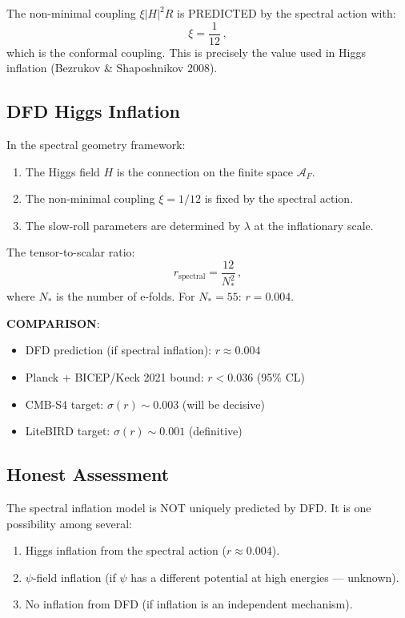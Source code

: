 \documentclass[11pt,a4paper]{article}
\begin{document}
The non-minimal coupling $\xi |H|^2 R$ is PREDICTED by the spectral action with:
\begin{equation}
\xi = \frac{1}{12}\,,
\end{equation}
which is the conformal coupling. This is precisely the value used in Higgs inflation (Bezrukov \& Shaposhnikov 2008).

\subsection{DFD Higgs Inflation}

In the spectral geometry framework:
\begin{enumerate}
\item The Higgs field $H$ is the connection on the finite space $\mathcal{A}_F$.
\item The non-minimal coupling $\xi = 1/12$ is fixed by the spectral action.
\item The slow-roll parameters are determined by $\lambda$ at the inflationary scale.
\end{enumerate}

The tensor-to-scalar ratio:
\begin{equation}
r_{\mathrm{spectral}} = \frac{12}{N_*^2}\,,
\end{equation}
where $N_*$ is the number of e-folds. For $N_* = 55$: $r = 0.004$.

\textbf{COMPARISON}:
\begin{itemize}
\item DFD prediction (if spectral inflation): $r \approx 0.004$
\item Planck + BICEP/Keck 2021 bound: $r < 0.036$ (95\% CL)
\item CMB-S4 target: $\sigma(r) \sim 0.003$ (will be decisive)
\item LiteBIRD target: $\sigma(r) \sim 0.001$ (definitive)
\end{itemize}

\subsection{Honest Assessment}

The spectral inflation model is NOT uniquely predicted by DFD. It is one possibility among several:
\begin{enumerate}
\item Higgs inflation from the spectral action ($r \approx 0.004$).
\item $\psi$-field inflation (if $\psi$ has a different potential at high energies --- unknown).
\item No inflation from DFD (if inflation is an independent mechanism).
\end{enumerate}
\end{document}

